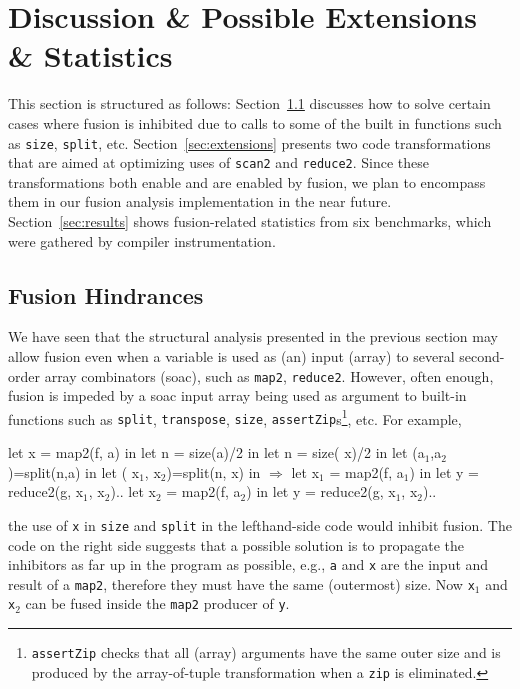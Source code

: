 \documentclass{sigplanconf}  %
\newcommand{\emp}[1]{\textcolor{DikuRed}{ #1}}
\newcommand{\emphh}[1]{\textcolor{CosGreen}{ #1}}
\newcommand{\mymath}[1]{$ #1 $}
\newcommand{\myindx}[1]{_{#1}}
\begin{document}
\section{Discussion \& Possible Extensions \& Statistics}
\label{sec:Discuss}

This section is structured as follows:
Section~\ref{sec:inhibitors} discusses how to
solve certain cases where fusion is inhibited due to calls
to some of the built in functions such as {\tt size}, {\tt split}, etc.
Section~\ref{sec:extensions} presents two code transformations that
are aimed at optimizing uses of {\tt scan2} and {\tt reduce2}. 
Since these transformations both enable and are enabled by fusion,
we plan to encompass them in our fusion analysis implementation in the
near future.
Section~\ref{sec:results} shows fusion-related statistics
from six benchmarks, which were gathered by compiler instrumentation.

\subsection{Fusion Hindrances}
\label{sec:inhibitors}

We have seen that the structural analysis presented in the previous section
may allow fusion even when a variable is used as (an) input (array) to several
second-order array combinators ({\sc soac}), such as {\tt map2}, {\tt reduce2}.
However, often enough, fusion is impeded by a {\sc soac} input array being
used as argument to built-in functions such as {\tt split}, {\tt transpose},
{\tt size}, {\tt assertZip}s\footnote{
{\tt assertZip} checks that all (array) arguments have the same outer size 
and is produced by the array-of-tuple transformation when a {\tt zip} is
eliminated.
}, etc.   For example,
\begin{colorcode}
let \emphh{x} = map2(f, a)      in    let n = size(a)/2      in
let n = size(\emp{x})/2       in    let (a\mymath{\myindx{1}},a\mymath{\myindx{2}})=split(n,a) in 
let (\emphh{x\mymath{\myindx{1}}},\emphh{x\mymath{\myindx{2}}})=split(n,\emp{x})  in \mymath{\Rightarrow} let \emphh{x\mymath{\myindx{1}}} = map2(f, a\mymath{\myindx{1}})   in
let y = reduce2(g,\emphh{x\mymath{\myindx{1}}},\emphh{x\mymath{\myindx{2}}})..    let \emphh{x\mymath{\myindx{2}}} = map2(f, a\mymath{\myindx{2}})   in
                              let y = reduce2(g,\emphh{x\mymath{\myindx{1}}},\emphh{x\mymath{\myindx{2}}})..
\end{colorcode}
the use of {\tt x} in {\tt size} and {\tt split} in the lefthand-side code 
would inhibit fusion.
The code on the right side suggests that a possible solution is to propagate 
the inhibitors as far up in the program as possible, e.g., {\tt a} and {\tt x} 
are the input and result of a {\tt map2}, therefore they must have the same 
(outermost) size. Now {\tt x$_1$} and {\tt x$_2$} can be fused inside the 
{\tt map2} producer of {\tt y}.
\end{document}
